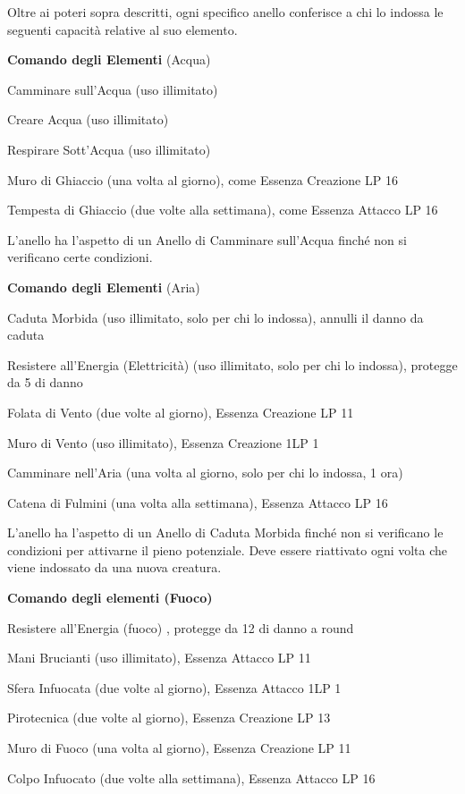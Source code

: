 \documentclass[a4paper,11pt,twoside,openany]{book}
\begin{document}
Oltre ai poteri sopra descritti, ogni specifico anello conferisce
a chi lo indossa le seguenti capacità relative al suo elemento.

\textbf{Comando degli Elementi} (Acqua)

Camminare sull'Acqua (uso illimitato)

Creare Acqua (uso illimitato)

Respirare Sott'Acqua (uso illimitato)

Muro di Ghiaccio (una volta al giorno), come Essenza Creazione LP 16

Tempesta di Ghiaccio (due volte alla settimana), come Essenza Attacco LP 16

L'anello ha l'aspetto di un Anello di Camminare sull'Acqua finché non si verificano certe condizioni.

\textbf{Comando degli Elementi} (Aria)

Caduta Morbida (uso illimitato, solo per chi lo indossa), annulli il danno da caduta

Resistere all'Energia (Elettricità) (uso illimitato, solo per chi lo indossa), protegge da 5 di danno

Folata di Vento (due volte al giorno), Essenza Creazione LP 11

Muro di Vento (uso illimitato), Essenza Creazione 1LP 1

Camminare nell'Aria (una volta al giorno, solo per chi lo indossa, 1 ora)

Catena di Fulmini (una volta alla settimana), Essenza Attacco LP 16

L'anello ha l'aspetto di un Anello di Caduta Morbida finché non si verificano le condizioni per attivarne il pieno potenziale. Deve essere riattivato ogni volta che viene indossato da una nuova creatura.

\textbf{Comando degli elementi (Fuoco)}

Resistere all'Energia (fuoco) , protegge da 12 di danno a round

Mani Brucianti (uso illimitato), Essenza Attacco LP 11

Sfera Infuocata (due volte al giorno), Essenza Attacco 1LP 1

Pirotecnica (due volte al giorno), Essenza Creazione LP 13

Muro di Fuoco (una volta al giorno), Essenza Creazione LP 11

Colpo Infuocato (due volte alla settimana), Essenza Attacco LP 16
\end{document}
